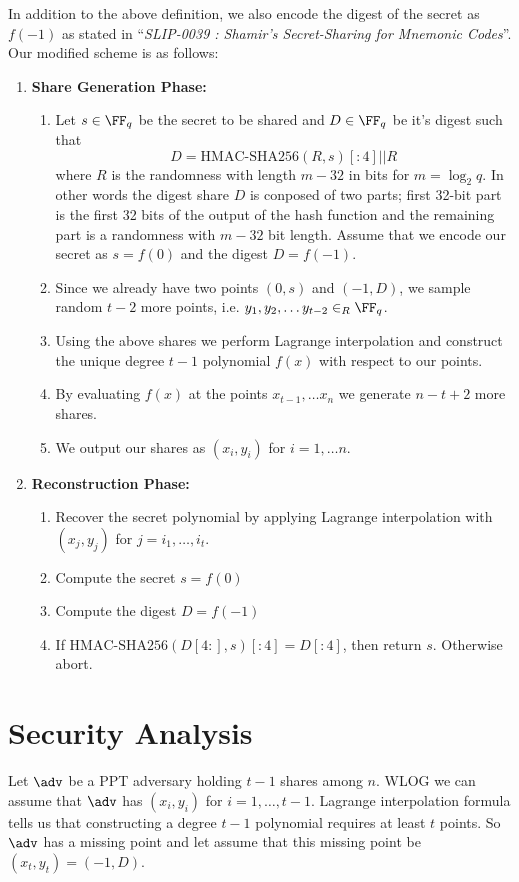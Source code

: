 \documentclass[envcountsame,runningheads,notitlepage]{llncs}
\begin{document}
	In addition to the above definition, we also encode the digest of the secret as $f(-1)$ as stated in ``\textit{SLIP-0039 : Shamir's Secret-Sharing for Mnemonic Codes}''. Our modified scheme is as follows:
	\begin{enumerate}
		\item \textbf{Share Generation Phase:}  
			\begin{enumerate}
				\item Let $s \in \FF_q$ be the secret to be shared and $D \in \FF_q$ be it's digest such that 
				\begin{equation*}
				D = \textrm{HMAC-SHA256}(R,s)[:4] || R
				\end{equation*} 
				where $R$ is the randomness with length $m-32$ in bits for $m = \log_{2}{q}$. In other words the digest share $D$ is conposed of two parts; first 32-bit part is the first 32 bits of the output of the hash function and the remaining part is a randomness with $m-32$ bit length. Assume that we encode our secret as $s = f(0)$ and the digest $D = f(-1)$.
				\item Since we already have two points $(0, s)$ and $(-1, D)$, we sample random $t-2$ more points, i.e. $y_{1}, y_{2}, \ldots y_{t-2} \in_{R} \FF_q$.
				\item Using the above shares we perform Lagrange interpolation and construct the unique degree $t-1$ polynomial $f (x)$ with respect to our points.  
				\item By evaluating $f (x)$ at the points $x_{t-1}, \ldots x_{n}$ we generate $n - t + 2$ more shares.
				\item We output our shares as $(x_{i},y_{i})$ for $i = 1, \ldots n$.
			\end{enumerate}
		\item \textbf{Reconstruction Phase:}  
			\begin{enumerate}
				\item Recover the secret polynomial by applying Lagrange interpolation with $(x_{j},y_{j})$ for $j = i_{1}, \ldots, i_{t}$.
				\item Compute the secret $s = f(0)$
				\item Compute the digest $D = f(-1)$
				\item If $\textrm{HMAC-SHA256}(D[4:],s)[:4] = D[:4]$, then return $s$. Otherwise abort. 
			\end{enumerate}
	\end{enumerate}
	
	\section{Security Analysis}
	Let $\adv$ be a PPT adversary holding $t-1$ shares among $n$. WLOG we can assume that $\adv$ has $(x_{i}, y_{i})$ for $i = 1, \ldots, t-1$. Lagrange interpolation formula tells us that constructing a degree $t-1$ polynomial requires at least $t$ points. So $\adv$ has a missing point and let assume that this missing point be $(x_{t},y_{t}) = (-1, D)$.
	
\end{document}
